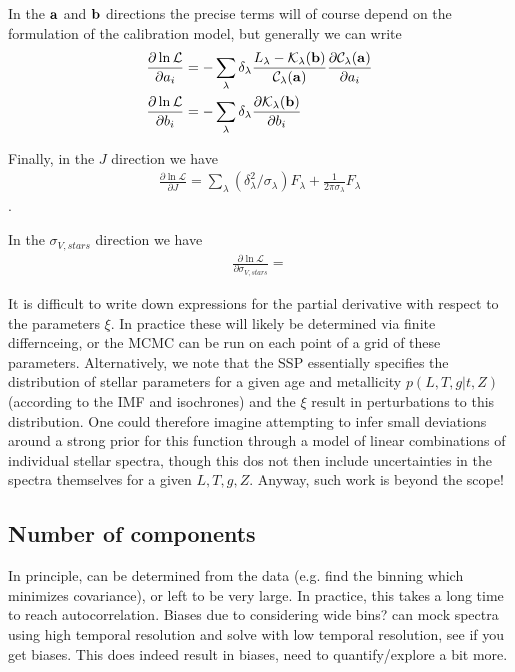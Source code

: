 \documentclass{emulateapj}
\begin{document}
In the ${\bf a}$ and  ${\bf b}$ directions the precise terms will of course depend on the formulation of the calibration model, but generally we can write
\begin{equation}
\begin{split}
&\frac{\partial \ln\mathcal{L}}{\partial a_i} = -\sum\limits_\lambda \delta_\lambda \frac{L_\lambda- \mathcal{K}_\lambda({\bf b})}{\mathcal{C}_\lambda({\bf a})}\frac{\partial \mathcal{C}_\lambda({\bf a})}{\partial a_i}\\
&\frac{\partial \ln\mathcal{L}}{\partial b_i} = -\sum\limits_\lambda \delta_\lambda \frac{\partial \mathcal{K}_\lambda({\bf b})}{\partial b_i}\\
\end{split}
\end{equation}


Finally, in the $J$ direction we have
\begin{equation}
\begin{split}
\frac{\partial \ln\mathcal{L}}{\partial J} = \sum\limits_\lambda (\delta_\lambda^2 /\sigma_\lambda) F_\lambda + \frac{1}{2\pi \sigma_\lambda}
F_\lambda
\end{split}
\end{equation}.

In the $\sigma_{V, stars}$ direction we have
\begin{equation}
\begin{split}
\frac{\partial \ln\mathcal{L}}{\partial \sigma_{V,stars}} = 
\end{split}
\end{equation}


It is difficult to write down expressions for the partial derivative with respect to the parameters $\xi$.  In practice these will likely be determined via finite differnceing, or the MCMC can be run on each point of a grid of these parameters.  Alternatively, we note that the SSP essentially specifies the distribution of stellar parameters for a given age and metallicity $p(L, T, g | t, Z)$ (according to the IMF and isochrones) and the $\xi$ result in perturbations to this distribution.  One could therefore imagine attempting to infer small deviations around a strong prior for this function through a model of linear combinations of individual stellar spectra, though this dos not then include uncertainties in the spectra themselves for a given $L,T,g, Z$.  Anyway, such work is beyond the scope!


\subsection{Number of components}
In principle, can be determined from the data (e.g. find the binning which minimizes covariance), or left to be very large.  In practice, this takes a long time to reach autocorrelation. Biases due to considering wide bins?  can mock spectra using high temporal resolution and solve with low temporal resolution, see if you get biases.  This does indeed result in biases, need to quantify/explore a bit more.
\end{document}
